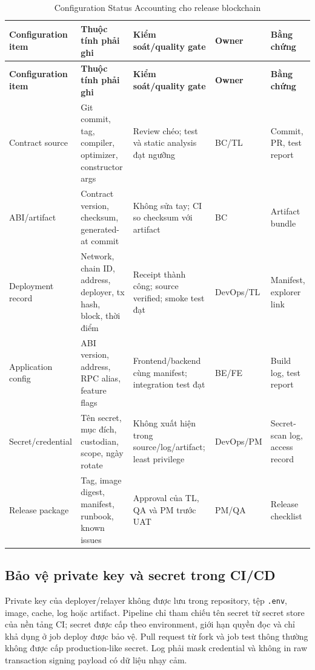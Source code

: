 \begin{landscape}
\begin{longtable}{| p{3.4cm} | p{6cm} | p{5cm} | p{3cm} | p{3.2cm} |}
\caption{Configuration Status Accounting cho release blockchain}\label{tab:blockchain-csa}\\
\hline
\textbf{Configuration item} & \textbf{Thuộc tính phải ghi} & \textbf{Kiểm soát/quality gate} & \textbf{Owner} & \textbf{Bằng chứng} \\
\hline
\endfirsthead
\hline
\textbf{Configuration item} & \textbf{Thuộc tính phải ghi} & \textbf{Kiểm soát/quality gate} & \textbf{Owner} & \textbf{Bằng chứng} \\
\hline
\endhead
Contract source & Git commit, tag, compiler, optimizer, constructor args & Review chéo; test và static analysis đạt ngưỡng & BC/TL & Commit, PR, test report \\ \hline
ABI/artifact & Contract version, checksum, generated-at commit & Không sửa tay; CI so checksum với artifact & BC & Artifact bundle \\ \hline
Deployment record & Network, chain ID, address, deployer, tx hash, block, thời điểm & Receipt thành công; source verified; smoke test đạt & DevOps/TL & Manifest, explorer link \\ \hline
Application config & ABI version, address, RPC alias, feature flags & Frontend/backend cùng manifest; integration test đạt & BE/FE & Build log, test report \\ \hline
Secret/credential & Tên secret, mục đích, custodian, scope, ngày rotate & Không xuất hiện trong source/log/artifact; least privilege & DevOps/PM & Secret-scan log, access record \\ \hline
Release package & Tag, image digest, manifest, runbook, known issues & Approval của TL, QA và PM trước UAT & PM/QA & Release checklist \\
\hline
\end{longtable}
\end{landscape}

\fi
\subsection{Bảo vệ private key và secret trong CI/CD}

Private key của deployer/relayer không được lưu trong repository, tệp \texttt{.env}, image, cache, log hoặc artifact. Pipeline chỉ tham chiếu tên secret từ secret store của nền tảng CI; secret được cấp theo environment, giới hạn quyền đọc và chỉ khả dụng ở job deploy được bảo vệ. Pull request từ fork và job test thông thường không được cấp production-like secret. Log phải mask credential và không in raw transaction signing payload có dữ liệu nhạy cảm.

